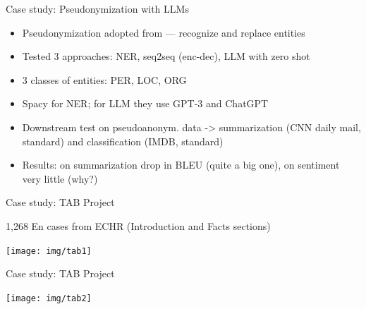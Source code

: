\documentclass[12pt,aspectratio=169,handout]{beamer}
\begin{document}
\begin{frame}{Case study: Pseudonymization with LLMs}

\begin{itemize}
\item Pseudonymization adopted from \citet{Eder.et.al.2022.LREC} --- recognize and replace entities
\item Tested 3 approaches: NER, seq2seq (enc-dec), LLM with zero shot
\item 3 classes of entities: PER, LOC, ORG
\item Spacy for NER; for LLM they use GPT-3 and ChatGPT
\item Downstream test on pseudoanonym. data -> summarization (CNN daily mail, standard) and classification (IMDB, standard)
\item Results: on summarization drop in BLEU (quite a big one), on sentiment very little (why?)
\end{itemize}


\end{frame}


\begin{frame}{Case study: TAB Project}

1,268 En cases from ECHR (Introduction and Facts sections)

\texttt{[image: img/tab1]}

\end{frame}


\begin{frame}{Case study: TAB Project}

\texttt{[image: img/tab2]}

\end{frame}
\end{document}
